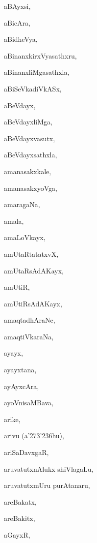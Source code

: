 \begin{multicols}{2}
{aBAyxsi}, \pageref{aBAyxsi}

{aBicAra}, \pageref{aBicAra}

{aBidheVya}, \pageref{aBidheVya}

{aBinanxkirxVyasathxru}, \pageref{aBinanxkirxVyasathxru}

{aBinanxliMgasathxla}, \pageref{aBinanxliMgasathxla}

{aBiSeVkadiVkASx}, \pageref{aBiSeVkadiVkASx}

{aBeVdayx}, \pageref{aBeVdayx}

{aBeVdayxliMga}, \pageref{aBeVdayxliMga}

{aBeVdayxvasutx}, \pageref{aBeVdayxvasutx}

{aBeVdayxsathxla}, \pageref{aBeVdayxsathxla}

{amanasakxkale}, \pageref{amanasakxkale}

{amanasakxyoVga}, \pageref{amanasakxyoVga}

{amaragaNa}, \pageref{amaragaNa}

{amala}, \pageref{amala}

{amaLoVkayx}, \pageref{amaLoVkayx}

{amUtaRtatatxvX}, \pageref{amUtaRtatatxvX}

{amUtaRsAdAKayx}, \pageref{amUtaRsAdAKayx}

{amUtiR}, \pageref{amUtiR}

{amUtiRsAdAKayx}, \pageref{amUtiRsAdAKayx}

{amaqtadhAraNe}, \pageref{amaqtadhAraNe}

{amaqtiVkaraNa}, \pageref{amaqtiVkaraNa}

{ayayx}, \pageref{ayayx}

{ayayxtana}, \pageref{ayayxtana}

{ayAyxcAra}, \pageref{ayAyxcAra}

{ayoVnisaMBava}, \pageref{ayoVnisaMBava}

{arike}, \pageref{arike}

{arivu (a\char'273\char'236hu)}, \pageref{arivu (a273236hu)}

{ariSaDavxgaR}, \pageref{ariSaDavxgaR}

{aruvatutxnAlukx shiVlagaLu}, \pageref{aruvatutxnAlukx shiVlagaLu}

{aruvatutxmUru purAtanaru}, \pageref{aruvatutxmUru purAtanaru}

{areBakatx}, \pageref{areBakatx}

{areBakitx}, \pageref{areBakitx}

{aGayxR}, \pageref{aGayxR}


\end{multicols}

